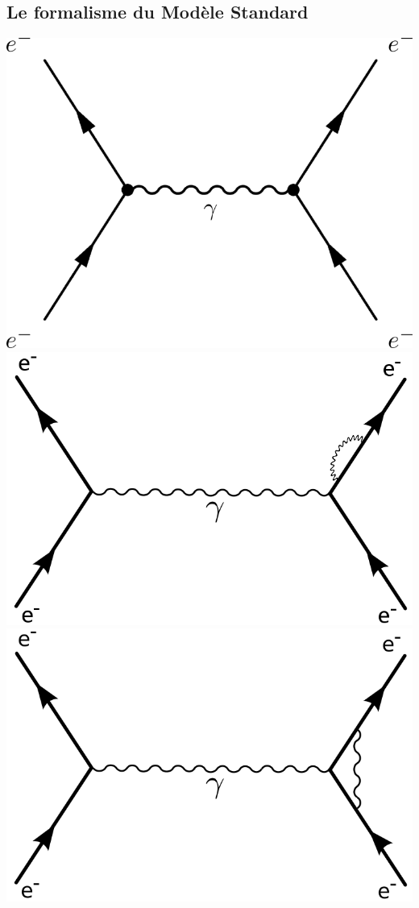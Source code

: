 \subsection{Le formalisme du Modèle Standard}
\marginpar
{
	\centering
	\includegraphics[width=\marginparwidth]{SM/feyn0.png}
	\includegraphics[width=\marginparwidth]{SM/feyn1.png}
	\includegraphics[width=\marginparwidth]{SM/feyn2.png}
}
